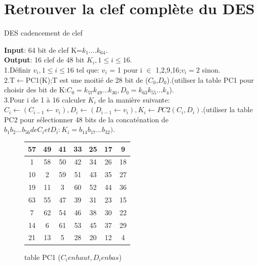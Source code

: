 \documentclass[a4paper]{report}
\begin{document}
		\chapter{Retrouver la clef complète du DES}
			\begin{algorithm}
				\caption{DES cadencement de clef}
				\hspace*{\algorithmicindent} \textbf{Input}: 64 bit de clef K=$k_{1} .... k_{64}$.\\
 				\hspace*{\algorithmicindent} \textbf{Output}: 16 clef de 48 bit $K_{i}, 1\leq i \leq 16$.\\
 				1.Définir $v_{i}, 1\leq i \leq 16$ tel que: $v_{i}$ = 1 pour i $\in$ {1,2,9,16};$v_{i}=2$ sinon.\\
 				2.T$\leftarrow$PC1(K);T est une moitié de 28 bit de ($C_{0}$,$D_{0}$).(utiliser la table PC1 pour choisir des bit de K:$C_{0}=k_{57}k_{49}...k_{36},D_{0}=k_{63}k_{55}...k_{4}$).\\
 				3.Pour i de 1 à 16 calculer $K_{i}$ de la manière suivante:\\
 					 $C_{i}\leftarrow (C_{i-1}\leftarrow v_{i}),D_{i}\leftarrow (D_{i-1}\leftarrow v_{i}),K_{i}\leftarrow PC2(C_{i},D_{i})$.(utiliser la table PC2 pour sélectionner 48 bits de la concaténation de $b_{1}b_{2}...b_{56} de C_{i} et D_{i}:K_{i}=b_{14}b_{17}...b_{32})$.
			\end{algorithm}
			\begin{figure}[h]
			\begin{tabular}{|c|c|c|c|c|c|c|}
				\hline
				57 & 49 & 41 & 33 & 25 & 17 & 9 \\ \hline
				1 & 58 & 50 & 42 & 34 & 26 & 18 \\ \hline
				10 & 2 & 59 & 51 & 43 & 35 & 27 \\ \hline
				19 & 11 & 3 & 60 & 52 & 44 & 36 \\ \hline
				\hline
				63 & 55 & 47 & 39 & 31 & 23 & 15 \\ \hline
				7 & 62 & 54 & 46 & 38 & 30 & 22 \\ \hline
				14 & 6 & 61 & 53 & 45 & 37 & 29 \\ \hline
				21 & 13 & 5 & 28 & 20 & 12 & 4 \\ \hline
			\end{tabular}
			\caption{table PC1 ($C_{i} en haut, D_{i} en bas$)}
			\end{figure}
		
\end{document}
